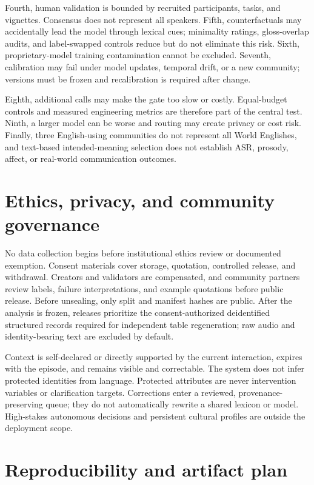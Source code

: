 \documentclass[preprint,12pt,authoryear]{elsarticle}
\begin{document}
Fourth, human validation is bounded by recruited participants, tasks, and
vignettes. Consensus does not represent all speakers. Fifth, counterfactuals
may accidentally lead the model through lexical cues; minimality ratings,
gloss-overlap audits, and label-swapped controls reduce but do not eliminate
this risk. Sixth, proprietary-model training contamination cannot be excluded.
Seventh, calibration may fail under model updates, temporal drift, or a new
community; versions must be frozen and recalibration is required after change.

Eighth, additional calls may make the gate too slow or costly. Equal-budget
controls and measured engineering metrics are therefore part of the central
test. Ninth, a larger model can be worse and routing may create privacy or
cost risk. Finally, three English-using communities do not represent all World
Englishes, and text-based intended-meaning selection does not establish ASR,
prosody, affect, or real-world communication outcomes.

\section{Ethics, privacy, and community governance}

No data collection begins before institutional ethics review or documented
exemption. Consent materials cover storage, quotation, controlled release, and
withdrawal. Creators and validators are compensated, and community partners
review labels, failure interpretations, and example quotations before public
release. Before unsealing, only split and manifest hashes are public. After the
analysis is frozen, releases prioritize the consent-authorized deidentified
structured records required for independent table regeneration; raw audio and
identity-bearing text are excluded by default.

Context is self-declared or directly supported by the current interaction,
expires with the episode, and remains visible and correctable. The system does
not infer protected identities from language. Protected attributes are never
intervention variables or clarification targets. Corrections enter a reviewed,
provenance-preserving queue; they do not automatically rewrite a shared
lexicon or model. High-stakes autonomous decisions and persistent cultural
profiles are outside the deployment scope.

\section{Reproducibility and artifact plan}
\end{document}
